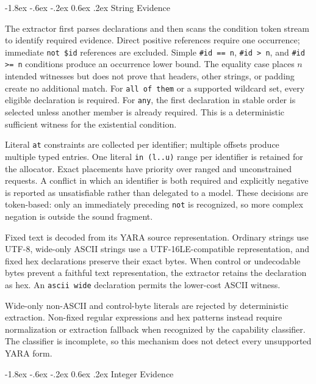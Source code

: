 \documentclass[11pt,twocolumn]{article}
\makeatletter
\newcommand{\code}[1]{\texttt{#1}}
\renewcommand\subsection{\@startsection{subsection}{2}{\z@}%
  {-1.8ex \@plus -.6ex \@minus -.2ex}%
  {0.6ex \@plus .2ex}%
  {\normalfont\normalsize\bfseries}}
\makeatother
\begin{document}
\subsection{String Evidence}

The extractor first parses declarations and then scans the condition token
stream to identify required evidence. Direct positive references require one
occurrence; immediate \code{not \$id} references are excluded. Simple
\code{\#id == n}, \code{\#id > n}, and \code{\#id >= n} conditions produce an
occurrence lower bound. The equality case places $n$ intended witnesses but does
not prove that headers, other strings, or padding create no additional match.
For \code{all of them} or a supported wildcard set, every eligible declaration
is required. For \code{any}, the first declaration in
stable order is selected unless another member is already required. This is a
deterministic sufficient witness for the existential condition.

Literal \code{at} constraints are collected per identifier; multiple offsets
produce multiple typed entries. One literal \code{in (l..u)} range per
identifier is retained for the allocator. Exact placements have priority over
ranged and unconstrained requests. A conflict in which an identifier is both
required and explicitly negative is reported as unsatisfiable rather than
delegated to a model. These decisions are token-based: only an immediately
preceding \code{not} is recognized, so more complex negation is outside the
sound fragment.

Fixed text is decoded from its YARA source representation. Ordinary strings use
UTF-8, wide-only ASCII strings use a UTF-16LE-compatible representation, and
fixed hex declarations preserve their exact bytes. When control or undecodable
bytes prevent a faithful text representation, the extractor retains the
declaration as hex. An \code{ascii wide} declaration permits the lower-cost
ASCII witness.

Wide-only non-ASCII and control-byte literals are rejected by deterministic
extraction. Non-fixed regular expressions and hex patterns instead require
normalization or extraction fallback when recognized by the capability
classifier. The classifier is incomplete, so this mechanism does not detect
every unsupported YARA form.

\subsection{Integer Evidence}
\end{document}
